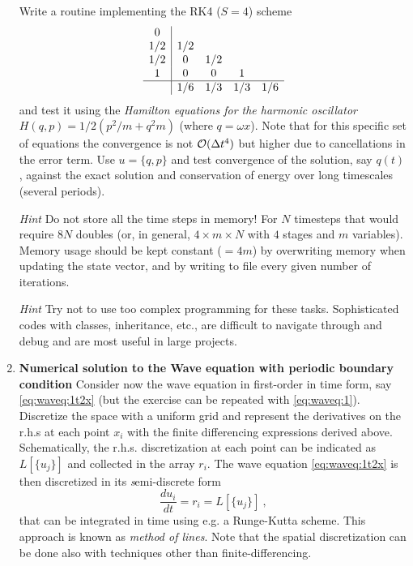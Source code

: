 \documentclass[11pt,a4paper,headinclude=true,DIV=14,BCOR=8mm,chapterprefix,listof=totoc,twoside,openright,abstracton]{scrbook}
\begin{document}
\begin{enumerate}
  Write a routine implementing the RK4 ($S=4$) scheme 
  \begin{equation} 
    \begin{array}
      {c|cccc}
      0   &  &  & & \\
      1/2 & 1/2 &  & & \\
      1/2 & 0 & 1/2 &  & \\
      1   & 0 & 0 &  1 & \\
      \hline
      & 1/6 & 1/3 & 1/3 & 1/6
    \end{array} 
  \end{equation}
  and test it using the \textit{Hamilton equations for the harmonic oscillator}
  $H(q,p)=1/2(p^2/m+q^2m)$ (where $q = \omega x$). Note that for this specific set of equations
  the convergence is not ${\cal O}(\Delta t^4)$ but higher due to cancellations
  in the error term.
  Use $u=\{q,p\}$ and test convergence of the solution,
  say $q(t)$, against the exact solution and conservation of energy
  over long timescales (several periods).

  {\textit{Hint}} Do not store all the time steps in memory! For $N$
  timesteps that would require $8N$ doubles (or, in general,
  $4\times m\times N$ with $4$ stages and $m$ variables). Memory usage should be kept constant
  ($=4m$) by overwriting memory when updating the state vector, and by writing to file every given number of iterations. 
  
  {\textit{Hint}} Try not to use too complex programming for these tasks. Sophisticated codes with classes, inheritance, etc., are difficult to navigate through and debug and are most useful in large projects.
  
\item \textbf{Numerical solution to the Wave equation with periodic boundary condition} Consider now the wave equation in first-order in time form, say
  \ref{eq:waveq:1t2x} (but the exercise can be repeated with
  \ref{eq:waveq:1}). Discretize the space with a uniform grid and
  represent the derivatives on the r.h.s at each point $x_i$ with the finite differencing
  expressions derived above. Schematically, the r.h.s. discretization
  at each point can be indicated as $L[\{u_j\}]$ and collected in the
  array $r_i$. The wave equation \ref{eq:waveq:1t2x} is then discretized in
  its {\textit semi-discrete} form 
  \begin{equation}
    \frac{du_i}{dt} = r_i = L[\{u_j\}]\ ,
  \end{equation}
  that can be integrated in time using e.g. a Runge-Kutta scheme.
  This approach is known as {\textit{method of lines}}. Note that the spatial
  discretization can be done also with techniques other than
  finite-differencing.


\end{enumerate}
\end{document}
